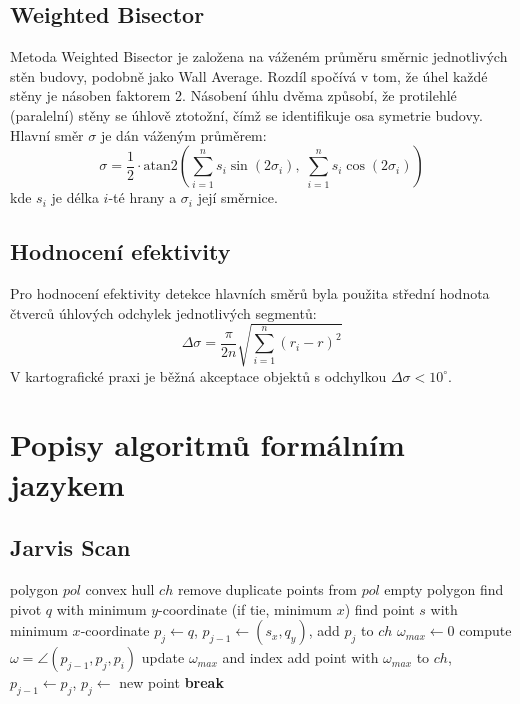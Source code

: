 \documentclass[11pt, a4paper]{article}
\begin{document}
\subsection{Weighted Bisector}
Metoda Weighted Bisector je založena na váženém průměru směrnic jednotlivých stěn budovy, podobně jako Wall Average. Rozdíl spočívá v tom, že úhel každé stěny je násoben faktorem 2. Násobení úhlu dvěma způsobí, že protilehlé (paralelní) stěny se úhlově ztotožní, čímž se identifikuje osa symetrie budovy. Hlavní směr $\sigma$ je dán váženým průměrem:
\begin{equation}
\sigma = \frac{1}{2} \cdot \text{atan2}\!\left(\sum_{i=1}^{n} s_i \sin(2\sigma_i),\; \sum_{i=1}^{n} s_i \cos(2\sigma_i)\right)
\end{equation}
kde $s_i$ je délka $i$-té hrany a $\sigma_i$ její směrnice.

\subsection{Hodnocení efektivity}
Pro hodnocení efektivity detekce hlavních směrů byla použita střední hodnota čtverců úhlových odchylek jednotlivých segmentů:
\begin{equation}
\Delta\sigma = \frac{\pi}{2n}\sqrt{\sum_{i=1}^{n}(r_i -r)^2}
\end{equation}
V kartografické praxi je běžná akceptace objektů s odchylkou $\Delta\sigma < 10^{\circ}$.

\newpage
\section{Popisy algoritmů formálním jazykem}

\subsection{Jarvis Scan}
\begin{algorithm}[H] \caption{Jarvis Scan}
\begin{algorithmic}[1]
\Require polygon $pol$
\Ensure convex hull $ch$
\State remove duplicate points from $pol$
 \Return empty polygon \EndIf
\State find pivot $q$ with minimum $y$-coordinate (if tie, minimum $x$)
\State find point $s$ with minimum $x$-coordinate
\State $p_j \gets q$, $p_{j-1} \gets (s_x, q_y)$, add $p_j$ to $ch$
    \State $\omega_{max} \gets 0$
        \State compute $\omega = \angle(p_{j-1}, p_j, p_i)$
         update $\omega_{max}$ and index \EndIf
    \EndFor
    \State add point with $\omega_{max}$ to $ch$, $p_{j-1} \gets p_j$, $p_j \gets$ new point
     \textbf{break} \EndIf
\EndWhile
\end{algorithmic}
\end{algorithm}
\end{document}
